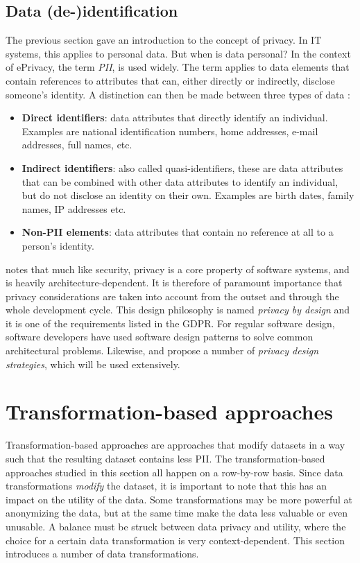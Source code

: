 \subsection{Data (de-)identification}
\label{sec:data-deid}
The previous section gave an introduction to the concept of privacy. In IT systems, this applies to personal data. But when is data personal? In the context of ePrivacy, the term \textit{\gls{PII}}, is used widely. The term applies to data elements that contain references to attributes that can, either directly or indirectly, disclose someone's identity. A distinction can then be made between three types of data \citep{de-id-taxonomy}:
\begin{itemize}
    \item \textbf{Direct identifiers}: data attributes that directly identify an individual. Examples are national identification numbers, home addresses, e-mail addresses, full names, etc.
    \item \textbf{Indirect identifiers}: also called quasi-identifiers, these are data attributes that can be combined with other data attributes to identify an individual, but do not disclose an identity on their own. Examples are birth dates, family names, IP addresses etc.
    \item \textbf{Non-PII elements}: data attributes that contain no reference at all to a person's identity.
\end{itemize}
\noindent \citeauthor{privacy-design-strategies} notes that much like security, privacy is a core property of software systems, and is heavily architecture-dependent. It is therefore of paramount importance that privacy considerations are taken into account from the outset and through the whole development cycle. This design philosophy is named \textit{privacy by design} and it is one of the requirements listed in the GDPR. For regular software design, software developers have used software design patterns to solve common architectural problems. Likewise, \citet{privacy-design-strategies} and \citet{de-id-taxonomy} propose a number of \textit{privacy design strategies}, which will be used extensively.

\section{Transformation-based approaches}
\label{sec:transformation-approaches}
Transformation-based approaches are approaches that modify datasets in a way such that the resulting dataset contains less \gls{PII}. The transformation-based approaches studied  in this section all happen on a row-by-row basis. Since data transformations \textit{modify} the dataset, it is important to note that this has an impact on the utility of the data. Some transformations may be more powerful at anonymizing the data, but at the same time make the data less valuable or even unusable. A balance must be struck between data privacy and utility, where the choice for a certain data transformation is very context-dependent. This section introduces a number of data transformations.

